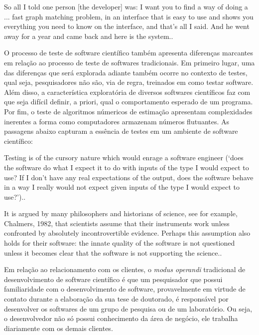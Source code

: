 \documentclass[
	article,			%
	11pt,				%
	oneside,			%
	a4paper,			%
	english,			%
	brazil,				%
	sumario=tradicional
	]{abntex2}
\begin{document}
\begin{citacao}
So all I told one person [the developer] was: I want you to find a way of doing a ... fast graph matching problem, in an interface that is easy to use and shows you everything you need to know on the interface, and that’s all I said. And he went away for a year and came back and here is the system.\cite{Models of scientific software development}.
\end{citacao}

O processo de teste de software científico também apresenta diferenças marcantes em relação ao processo de teste de softwares tradicionais. Em primeiro lugar, uma das diferenças que será explorada adiante também ocorre no contexto de testes, qual seja, pesquisadores não são, via de regra, treinados em como testar software. Além disso, a característica exploratória de diversos softwares científicos faz com que seja difícil definir, a priori, qual o comportamento esperado de um programa. Por fim, o teste de algoritmos númericos de estimação apresentam complexidades inerentes a forma como computadores armazenam números flutuantes. As passagens abaixo capturam a essência de testes em um ambiente de software científico:

\begin{citacao}
Testing is of the cursory nature which would enrage a software engineer (‘does the software do what I expect it to do with inputs of the type I would expect to use? If I don’t have any real expectations of the output, does the software behave in a way I really would not expect given inputs of the type I would expect to use?’).\cite{Models of scientific software development}.
\end{citacao}

\begin{citacao}
It is argued by many philosophers and historians of science, see for example, Chalmers, 1982, that scientists assume that their instruments work unless confronted by absolutely incontrovertible evidence. Perhaps this assumption also holds for their software: the innate quality of the software is not questioned unless it becomes clear that the software is not supporting the science.\cite{Scientists and software engineers - A tale of two cultures}.
\end{citacao}

Em relação ao relacionamento com os clientes, o \emph{modus operandi} tradicional de desenvolvimento de software científico é que um pesquisador que possui familiaridade com o desenvolvimento de software, provavelmente em virtude de contato durante a elaboração da sua tese de doutorado, é responsável por desenvolver os softwares de um grupo de pesquisa ou de um laboratório. Ou seja, o desenvolvedor não só possui conhecimento da área de negócio, ele trabalha diariamente com os demais clientes.
\end{document}

